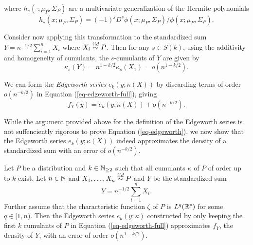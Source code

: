 where $h_s(\cdot; \mu_P, \Sigma_P)$ are a multivariate generalization of the Hermite polynomials
\begin{equation*}
    h_s(x; \mu_P, \Sigma_P) = (-1)^j D^s \phi(x; \mu_P, \Sigma_P) / \phi(x; \mu_P, \Sigma_P).
\end{equation*}

Consider now applying this transformation to the standardized sum $Y = n^{-1/2}\sum_{i=1}^n X_i$ where $X_i \stackrel{iid}{\sim} P$. Then for any $s \in S(k)$, using the additivity and homogeneity of cumulants, the $s$-cumulants of $Y$ are given by 
\begin{equation*}
    \kappa_s(Y) = n^{1-k/2} \kappa_s(X_1) = o(n^{1-k/2}).
\end{equation*}

We can form the \textit{Edgeworth series} $e_k(y; \kappa(X))$ by discarding terms of order $o(n^{-k/2})$ in Equation (\ref{eq-edgeworth-full}), giving
\begin{equation} \label{eq-edgeworth}
    f_Y(y) = e_k(y; \kappa(X)) + o(n^{-k/2}).
\end{equation}

While the argument provided above for the definition of the Edgeworth series is not suffenciently rigorous to prove Equation (\ref{eq-edgeworth}), we now show that the Edgeworth series $e_k(y; \kappa(X))$ indeed approximates the density of a standardized sum with an error of $o(n^{-k/2})$.

\begin{theorem} \label{thm-edgeworth}
    Let $P$ be a distribution and $k \in \mathbb{N}_{\geq 2}$ such that all cumulants $\kappa$ of $P$ of order up to $k$ exist. Let $n \in \mathbb{N}$ and $X_1, \ldots, X_n \stackrel{iid}{\sim} P$ and $Y$ be the standardized sum
    \begin{equation*}
        Y = n^{-1/2}\sum_{i=1}^n X_i.
    \end{equation*}
    Further assume that the characteristic function $\zeta$ of $P$ is $L^q({\mathbb{R}^p})$ for some $q \in [1, n)$. Then the Edgeworth series $e_k(y; \kappa)$ constructed by only keeping the first $k$ cumulants of $P$ in Equation (\ref{eq-edgeworth-full}) approximates $f_Y$, the density of $Y$, with an error of order $o(n^{1 - k/2})$.
\end{theorem}

